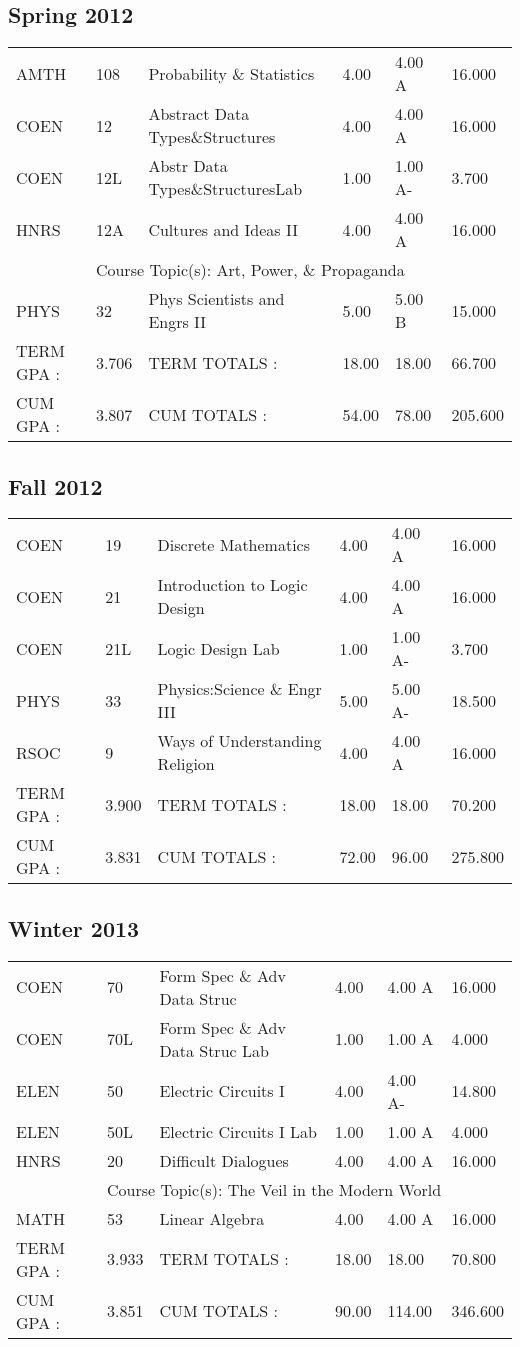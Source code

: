 \documentclass{article}\usepackage[T1]{fontenc}
\begin{document}
\subsection{Spring 2012}
\begin{tabular}{ l  l  l  l  l  l }
AMTH&108&Probability \& Statistics&4.00&4.00 A&16.000\\
COEN&12&Abstract Data Types\&Structures&4.00&4.00 A&16.000\\
COEN&12L&Abstr Data Types\&StructuresLab&1.00&1.00 A-&3.700\\
HNRS&12A&Cultures and Ideas II&4.00&4.00 A&16.000\\
&
\multicolumn{5}{l}{Course Topic(s): Art, Power, \& Propaganda}
\\
PHYS&32&Phys Scientists and Engrs II&5.00&5.00 B&15.000\\
\hline
TERM GPA :&3.706&TERM TOTALS :&18.00&18.00&66.700\\
CUM GPA :&3.807&CUM TOTALS :&54.00&78.00&205.600\\\end{tabular}
\subsection{Fall 2012}
\begin{tabular}{ l  l  l  l  l  l }
COEN&19&Discrete Mathematics&4.00&4.00 A&16.000\\
COEN&21&Introduction to Logic Design&4.00&4.00 A&16.000\\
COEN&21L&Logic Design Lab&1.00&1.00 A-&3.700\\
PHYS&33&Physics:Science \& Engr III&5.00&5.00 A-&18.500\\
RSOC&9&Ways of Understanding Religion&4.00&4.00 A&16.000\\
\hline
TERM GPA :&3.900&TERM TOTALS :&18.00&18.00&70.200\\
CUM GPA :&3.831&CUM TOTALS :&72.00&96.00&275.800\\\end{tabular}
\subsection{Winter 2013}
\begin{tabular}{ l  l  l  l  l  l }
COEN&70&Form Spec \& Adv Data Struc&4.00&4.00 A&16.000\\
COEN&70L&Form Spec \& Adv Data Struc Lab&1.00&1.00 A&4.000\\
ELEN&50&Electric Circuits I&4.00&4.00 A-&14.800\\
ELEN&50L&Electric Circuits I Lab&1.00&1.00 A&4.000\\
HNRS&20&Difficult Dialogues&4.00&4.00 A&16.000\\
&
\multicolumn{5}{l}{Course Topic(s): The Veil in the Modern World}
\\
MATH&53&Linear Algebra&4.00&4.00 A&16.000\\
\hline
TERM GPA :&3.933&TERM TOTALS :&18.00&18.00&70.800\\
CUM GPA :&3.851&CUM TOTALS :&90.00&114.00&346.600\\\end{tabular}
\end{document}
